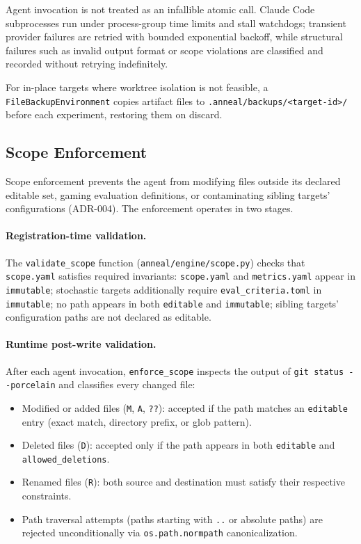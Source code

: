 Agent invocation is not treated as an infallible atomic call.
Claude Code subprocesses run under process-group time limits and stall watchdogs; transient provider failures are retried with bounded exponential backoff, while structural failures such as invalid output format or scope violations are classified and recorded without retrying indefinitely.

For in-place targets where worktree isolation is not feasible, a \texttt{File\allowbreak{}Backup\allowbreak{}Environment} copies artifact files to \texttt{.anneal/\allowbreak{}backups/\allowbreak{}<target-id>/} before each experiment, restoring them on discard.

\subsection{Scope Enforcement}\label{sec:scope}

Scope enforcement prevents the agent from modifying files outside its declared editable set, gaming evaluation definitions, or contaminating sibling targets' configurations (ADR-004).
The enforcement operates in two stages.

\paragraph{Registration-time validation.}
The \texttt{validate\allowbreak{}\_\allowbreak{}scope} function (\texttt{anneal/\allowbreak{}engine/\allowbreak{}scope.py}) checks that \texttt{scope.yaml} satisfies required invariants: \texttt{scope.yaml} and \texttt{metrics.yaml} appear in \texttt{immutable}; stochastic targets additionally require \texttt{eval\allowbreak{}\_criteria.toml} in \texttt{immutable}; no path appears in both \texttt{editable} and \texttt{immutable}; sibling targets' configuration paths are not declared as editable.

\paragraph{Runtime post-write validation.}
After each agent invocation, \texttt{enforce\_scope} inspects the output of \texttt{git status -{}-porcelain} and classifies every changed file:
\begin{itemize}
    \item Modified or added files (\texttt{M}, \texttt{A}, \texttt{??}): accepted if the path matches an \texttt{editable} entry (exact match, directory prefix, or glob pattern).
    \item Deleted files (\texttt{D}): accepted only if the path appears in both \texttt{editable} and \texttt{allowed\_deletions}.
    \item Renamed files (\texttt{R}): both source and destination must satisfy their respective constraints.
    \item Path traversal attempts (paths starting with \texttt{..} or absolute paths) are rejected unconditionally via \texttt{os.path.normpath} canonicalization.
\end{itemize}


